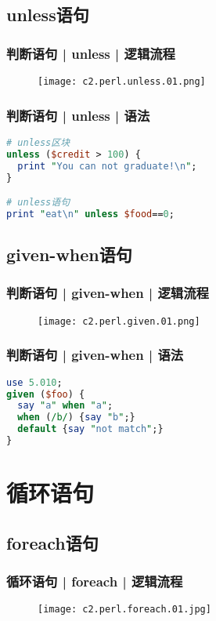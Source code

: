 \subsection{unless语句}
\begin{frame}
  \frametitle{判断语句 | unless | 逻辑流程}
  \begin{figure}
    \centering
    \texttt{[image: c2.perl.unless.01.png]}
  \end{figure}
\end{frame}

\begin{frame}[fragile]
  \frametitle{判断语句 | unless | \alert{语法}}
\begin{lstlisting}[language=Perl]
# unless区块
unless ($credit > 100) {
  print "You can not graduate!\n";
}

# unless语句
print "eat\n" unless $food==0;
\end{lstlisting}
\end{frame}

\subsection{given-when语句}
\begin{frame}
  \frametitle{判断语句 | given-when | 逻辑流程}
  \begin{figure}
    \centering
    \texttt{[image: c2.perl.given.01.png]}
  \end{figure}
\end{frame}

\begin{frame}[fragile]
  \frametitle{判断语句 | given-when | 语法}
\begin{lstlisting}[language=Perl]
use 5.010;
given ($foo) {
  say "a" when "a";
  when (/b/) {say "b";}
  default {say "not match";}
}
\end{lstlisting}
\end{frame}

\section{循环语句}
\subsection{foreach语句}
\begin{frame}
  \frametitle{循环语句 | foreach | 逻辑流程}
  \begin{figure}
    \centering
    \texttt{[image: c2.perl.foreach.01.jpg]}
  \end{figure}
\end{frame}

